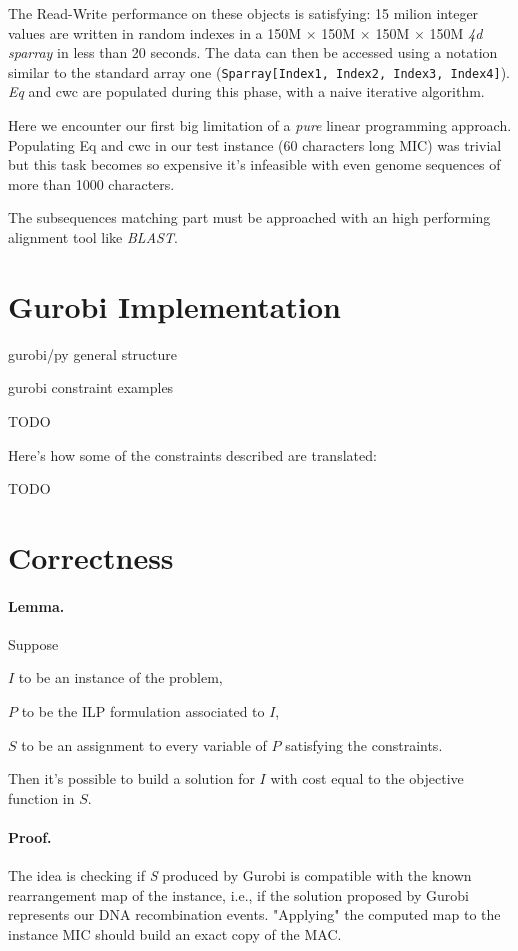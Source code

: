 The Read-Write performance on these objects is satisfying: 15 milion integer values are written in random indexes in a 150M $\times$ 150M $\times$ 150M $\times$ 150M \textit{4d sparray} in less than 20 seconds. The data can then be accessed using a notation similar to the standard array one (\texttt{Sparray[Index1, Index2, Index3, Index4]}). \textit{Eq} and {cwc} are populated during this phase, with a naive iterative algorithm.

Here we encounter our first big limitation of a \textit{pure} linear programming approach. Populating Eq and cwc in our test instance (60 characters long MIC) was trivial but this task becomes so expensive it's infeasible with even genome sequences of more than 1000 characters.

The subsequences matching part must be approached with an high performing alignment tool like \textit{BLAST}.

\section{Gurobi Implementation}
gurobi/py general structure

gurobi constraint examples

TODO

Here's how some of the constraints described are translated:

TODO

\section{Correctness}
\label{correctness}

\paragraph{Lemma.}
Suppose

$I$ to be an instance of the problem,

$P$ to be the ILP formulation associated to $I$,

$S$ to be an assignment to every variable of $P$ satisfying the constraints.

Then it's possible to build a solution for $I$ with cost equal to the objective function in $S$.

\paragraph{Proof.}
The idea is checking if \textit{S} produced by Gurobi is compatible with the known rearrangement map of the instance, i.e., if the solution proposed by Gurobi represents our DNA recombination events. "Applying" the computed map to the instance MIC should build an exact copy of the MAC.

